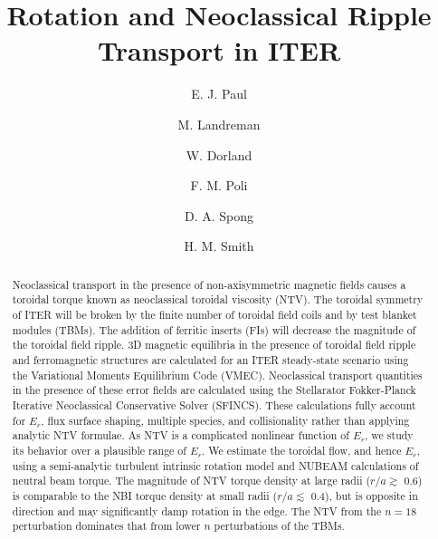 \documentclass[aip, pop, preprint]{revtex4-1}
\numberwithin{figure}{section}
\numberwithin{equation}{section}
\begin{document}
\title{Rotation and Neoclassical Ripple Transport in ITER}
\author{E. J. Paul}

\author{M. Landreman}

\author{W. Dorland}

\author{F. M. Poli}

\author{D. A. Spong}

\author{H. M. Smith}

\begin{abstract}

Neoclassical transport in the presence of non-axisymmetric magnetic fields causes a toroidal torque known as neoclassical toroidal viscosity (NTV). The toroidal symmetry of ITER will be broken by the finite number of toroidal field coils and by test blanket modules (TBMs). The addition of ferritic inserts (FIs) will decrease the magnitude of the toroidal field ripple. 3D magnetic equilibria in the presence of toroidal field ripple and ferromagnetic structures are calculated for an ITER steady-state scenario using the Variational Moments Equilibrium Code (VMEC). Neoclassical transport quantities in the presence of these error fields are calculated using the Stellarator Fokker-Planck Iterative Neoclassical Conservative Solver (SFINCS). These calculations fully account for $E_r$, flux surface shaping, multiple species, and collisionality rather than applying analytic NTV formulae. As NTV is a complicated nonlinear function of $E_r$, we study its behavior over a plausible range of $E_r$. We estimate the toroidal flow, and hence $E_r$, using a semi-analytic turbulent intrinsic rotation model and NUBEAM calculations of neutral beam torque. The magnitude of NTV torque density at large radii ($r/a \gtrsim$ 0.6) is comparable to the NBI torque density at small radii ($r/a \lesssim$ 0.4), but is opposite in direction and may significantly damp rotation in the edge. The NTV from the $n = 18$ perturbation dominates that from lower $n$ perturbations of the TBMs. 
\end{abstract}
\end{document}
